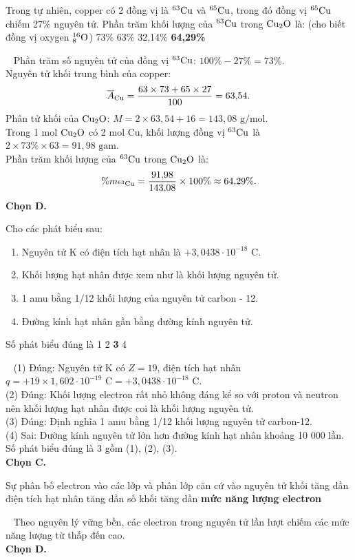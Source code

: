 \documentclass[12pt,a4paper]{article}
\renewcommand{\loigiai}[1]{%
  \par\smallskip\noindent{\color{blue!80!black}\textbf{Lời giải:}}\ #1\par\smallskip
}
\renewcommand{\True}{\bfseries\color{red!80!black}}
\begin{document}
\begin{ex}
Trong tự nhiên, copper có 2 đồng vị là $^{63}\ce{Cu}$ và $^{65}\ce{Cu}$, trong đó đồng vị $^{65}\ce{Cu}$ chiếm 27\% nguyên tử. Phần trăm khối lượng của $^{63}\ce{Cu}$ trong $\ce{Cu2O}$ là: (cho biết đồng vị oxygen $^{16}_8\ce{O}$)
\choice
{73\%}
{63\%}
{32{,}14\%}
{\True 64{,}29\%}
\loigiai{
Phần trăm số nguyên tử của đồng vị $^{63}\ce{Cu}$: $100\% - 27\% = 73\%$.\\
Nguyên tử khối trung bình của copper:
\[\overline{A}_{\ce{Cu}} = \dfrac{63 \times 73 + 65 \times 27}{100} = 63{,}54.\]
Phân tử khối của $\ce{Cu2O}$: $M = 2 \times 63{,}54 + 16 = 143{,}08\text{ g/mol}$.\\
Trong 1 mol $\ce{Cu2O}$ có 2 mol Cu, khối lượng đồng vị $^{63}\ce{Cu}$ là $2 \times 73\% \times 63 = 91{,}98\text{ gam}$.\\
Phần trăm khối lượng của $^{63}\ce{Cu}$ trong $\ce{Cu2O}$ là:
\[\%m_{^{63}\ce{Cu}} = \dfrac{91{,}98}{143{,}08} \times 100\% \approx 64{,}29\%.\]
\textbf{Chọn D.}
}
\end{ex}

\begin{ex}
Cho các phát biểu sau:
\begin{enumerate}[(1)]
	\item Nguyên tử K có điện tích hạt nhân là $+3{,}0438 \cdot 10^{-18}\text{ C}$.
	\item Khối lượng hạt nhân được xem như là khối lượng nguyên tử.
	\item 1 amu bằng 1/12 khối lượng của nguyên tử carbon - 12.
	\item Đường kính hạt nhân gần bằng đường kính nguyên tử.
\end{enumerate}
Số phát biểu đúng là
\choice
{1}
{2}
{\True 3}
{4}
\loigiai{
(1) Đúng: Nguyên tử K có $Z = 19$, điện tích hạt nhân $q = +19 \times 1{,}602 \cdot 10^{-19}\text{ C} = +3{,}0438 \cdot 10^{-18}\text{ C}$.\\
(2) Đúng: Khối lượng electron rất nhỏ không đáng kể so với proton và neutron nên khối lượng hạt nhân được coi là khối lượng nguyên tử.\\
(3) Đúng: Định nghĩa 1 amu bằng 1/12 khối lượng nguyên tử carbon-12.\\
(4) Sai: Đường kính nguyên tử lớn hơn đường kính hạt nhân khoảng 10 000 lần.\\
Số phát biểu đúng là 3 gồm (1), (2), (3).\\
\textbf{Chọn C.}
}
\end{ex}

\begin{ex}
Sự phân bố electron vào các lớp và phân lớp căn cứ vào
\choice
{nguyên tử khối tăng dần}
{điện tích hạt nhân tăng dần}
{số khối tăng dần}
{\True mức năng lượng electron}
\loigiai{
Theo nguyên lý vững bền, các electron trong nguyên tử lần lượt chiếm các mức năng lượng từ thấp đến cao.\\
\textbf{Chọn D.}
}
\end{ex}
\end{document}
